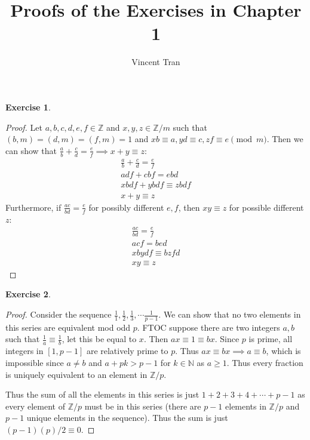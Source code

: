 \documentclass[11pt]{article}
\theoremstyle{definition}
\newtheorem{exercise}{{Exercise}}
\begin{document}
\author{Vincent Tran}
\title{Proofs of the Exercises in Chapter 1}
\maketitle

\begin{exercise}
	\begin{proof}
	Let \(a,b,c,d,e,f\in\mathbb{Z} \) and \(x,y,z\in\mathbb{Z}/m \) such that \((b,m) = (d,m) = (f,m) = 1 \) and \(xb  \equiv a, yd\equiv c, zf \equiv e \pmod{m}\).
	Then we can show that \(\frac{a}{b}+\frac{c}{d}=\frac{e}{f} \implies  x+y\equiv z\):
	\begin{align*}
		\frac{a}{b}+\frac{c}{d}=\frac{e}{f}\\
		adf + cbf = ebd\\
		xbdf + ybdf \equiv zbdf\\
		x+y\equiv z
	\end{align*}
	Furthermore, if \(\frac{ac}{bd}= \frac{e}{f}\) for possibly different \(e,f \), then \(xy \equiv z \) for possible different \(z \):
	\begin{align*}
		\frac{ac}{bd}=\frac{e}{f}\\
		acf = bed\\
		xbydf \equiv bzfd\\
		xy \equiv z
	\end{align*}
	\end{proof}
\end{exercise}

\begin{exercise}
	\begin{proof}
	Consider the sequence \(\frac{1}{1},\frac{1}{2},\frac{1}{3}, \cdots \frac{1}{p-1} \). We can show that no two elements in this series are equivalent mod odd \(p \). FTOC suppose there are two integers \(a,b \) such that \(\frac{1}{a} \equiv\frac{1}{b}\), let this be equal to \(x \). Then \(ax \equiv 1 \equiv bx \). Since \(p \) is prime, all integers in \([1,p-1] \) are relatively prime to \(p \). Thus \(ax\equiv bx \implies a\equiv b \), which is impossible since \(a\ne b \)  and \(a + pk > p-1 \) for \(k\in\mathbb{N} \) as \(a \ge 1 \). Thus every fraction is uniquely equivalent to an element in \(\mathbb{Z}/p \).

	Thus the sum of all the elements in this series is just \(1+2+3+4+\cdots +p-1 \) as every element of \(\mathbb{Z}/p \) must be in this series (there are \(p-1 \) elements in \(\mathbb{Z}/p \) and \(p-1 \) unique elements in the sequence). Thus the sum is just \((p-1)(p)/2 \equiv 0\).
	\end{proof}
\end{exercise}
\end{document}
